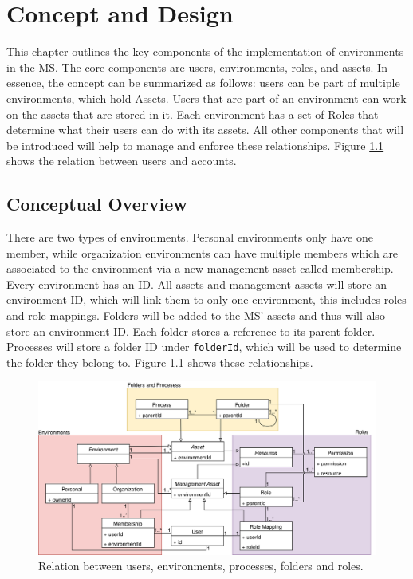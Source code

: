 \chapter{Concept and Design}
\label{cha:conceptanddesign}

\vspace{-3.5em} %

This chapter outlines the key components of the implementation of environments in the MS.
The core components are users, environments, roles, and assets.
In essence, the concept can be summarized as follows: users can be part of multiple
environments, which hold Assets.
Users that are part of an environment can work on the assets that are stored in it.
Each environment has a set of Roles that determine what their users can do with its
assets.
All other components that will be introduced will help to manage and enforce these relationships.
Figure \ref{fig:concept-uml} shows the relation between users and accounts.


\section{Conceptual Overview}

There are two types of environments.
Personal environments only have one member, while organization environments can have
multiple members which are associated to the environment via a new management asset called
membership.
Every environment has an ID.
All assets and management assets will store an environment ID, which will link them to
only one environment, this includes roles and role mappings.
%
Folders will be added to the MS' assets and thus will also store an environment ID.
Each folder stores a reference to its parent folder.
Processes will store a folder ID under \lstinline{folderId}, which will be used to determine the folder they belong to.
Figure \ref{fig:concept-uml} shows these relationships.

\begin{figure}[H]
	\centering
	\includegraphics[scale=0.1185]{../figures/concept_uml.png}
	\caption{Relation between users, environments, processes, folders and roles.}
  \label{fig:concept-uml}
	\vspace{-1em} %
\end{figure}


